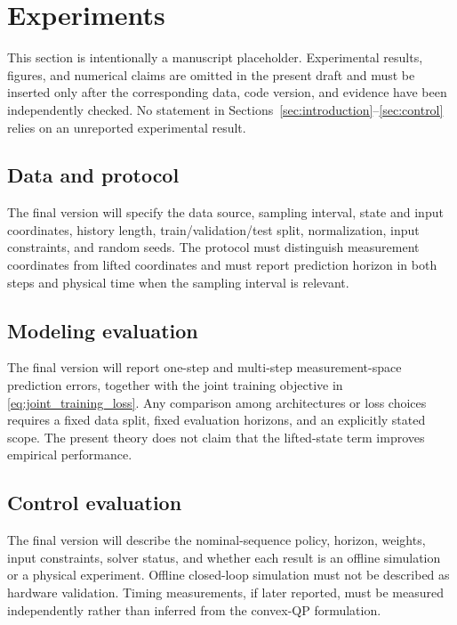 \documentclass[journal]{IEEEtran}
\begin{document}
\section{Experiments}
\label{sec:experiments}

This section is intentionally a manuscript placeholder. Experimental results, figures, and numerical claims are omitted in the present draft and must be inserted only after the corresponding data, code version, and evidence have been independently checked. No statement in Sections~\ref{sec:introduction}--\ref{sec:control} relies on an unreported experimental result.

\subsection{Data and protocol}

The final version will specify the data source, sampling interval, state and input coordinates, history length, train/validation/test split, normalization, input constraints, and random seeds. The protocol must distinguish measurement coordinates from lifted coordinates and must report prediction horizon in both steps and physical time when the sampling interval is relevant.

\subsection{Modeling evaluation}

The final version will report one-step and multi-step measurement-space prediction errors, together with the joint training objective in \eqref{eq:joint_training_loss}. Any comparison among architectures or loss choices requires a fixed data split, fixed evaluation horizons, and an explicitly stated scope. The present theory does not claim that the lifted-state term improves empirical performance.

\subsection{Control evaluation}

The final version will describe the nominal-sequence policy, horizon, weights, input constraints, solver status, and whether each result is an offline simulation or a physical experiment. Offline closed-loop simulation must not be described as hardware validation. Timing measurements, if later reported, must be measured independently rather than inferred from the convex-QP formulation.
\end{document}
